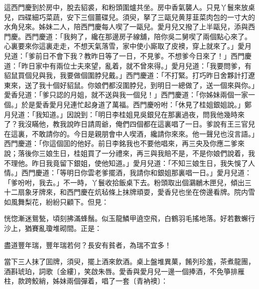 這西門慶到於房中，脫去貂裘，和粉頭圍爐共坐。房中香氣襲人。只見丫鬟來放桌兒，四碟細巧菜蔬，安下三個薑碟兒。須臾，拏了三甌兒黄芽韮菜肉包的一寸大的水角兒來。姊妹二人，陪西門慶每人喫了一甌兒。愛月兒又撥了上半甌兒，添與西門慶。西門慶道：「我夠了，纔在那邊房子線舖，陪你吳二舅喫了兩個點心來了。心裏要來你這裏走走，不想天氣落雪，家中使小廝取了皮襖，穿上就來了。」愛月兒道：「爹前日不會下我？教昨日等了一日，不見爹。不想爹今日來了！」西門慶道：「昨日家中有兩位士夫來望，亂着，就不曾來得。」愛月兒道：「我要問爹，有貂鼠買個兒與我，我要做個圍脖兒戴。」西門慶道：「不打緊。打巧昨日舍夥計打遼東來，送了我十個好貂鼠。你娘們都沒圍脖兒，到明日一總做了，送一個來與你。」愛香兒道：「爹只認的月姐，就不送與我一個兒！」西門慶道：「你姊妹兩個一家一個。」於是愛香愛月兒連忙起身道了萬福。西門慶吩咐：「休見了桂姐銀姐說。」鄭月兒道：「我知道。」因說到：「明日李桂姐見吳銀兒在那裏過夜，問我他幾時來了？我沒瞞他，教我說昨日請周爺，俺們四個都在這裏唱了一日。爹說有王三官兒在這裏，不敢請你的。今日是親朋會中人喫酒，纔請你來來。他一聲兒也沒言語。」西門慶道：「你這個囬的他好。前日李銘我也不要他唱來，再三央及你應二爹來說；落後你三娘生日，桂姐買了一分禮來，再三與我賠不是，不是你娘們說着，我不理他。昨日我竟留下銀姐，使他知道。」愛月兒道：「不知三娘生日，我失悞了人情。」西門慶道：「等明日你雲老爹擺酒，我請你和銀姐那裏唱一日。」愛月兒道：「爹吩咐，我去。」不一時，丫鬟收拾飯桌下去。粉頭取出個鸂鶒木匣兒，傾出三十二扇象牙牌來，和西門慶在炕毡條上抹牌頑耍，愛香兒也坐在傍邊看牌。院内雪如風舞梨花，紛紛只顧下。但見：

\begin{myquote}
恍惚漸迷鴛甃，頃刻拂滿蜂鬚。似玉龍鱗甲遶空飛，白鶴羽毛搖地落。好若數蠏行沙上，猶賽亂瓊堆砌間。正是：

盡道豐年瑞，豐年瑞若何？長安有貧者，為瑞不宜多！
\end{myquote}

當下三人抹了囬牌，須臾，擺上酒來飲酒。桌上盤堆異菓，餚列珍羞，茶煮龍團，酒斟琥珀，詞歌〔金縷〕，笑啟朱唇。愛香與愛月兒一邊一個捧酒，不免箏排雁柱，款跨鮫綃，姊妹兩個彈着，唱了一套〔青衲襖〕：

